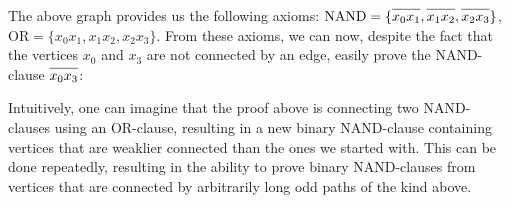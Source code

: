 \FloatBarrier
The above graph provides us the following axioms:
$\text{NAND} = \{\ol{x_0x_1},\ol{x_1x_2},\ol{x_2x_3}\}$, $\text{OR} = \{x_0x_1,x_1x_2,x_2x_3\}$.
From these axioms, we can now, despite the fact that the vertices $x_0$ and $x_3$ are not connected by an edge, easily prove the NAND-clause $\ol{x_0x_3}$:\par
\begin{figure}[!h]
  \centering
  \begin{prooftree*}
  \end{prooftree*}
\caption{}
\label{fig:proof_x0x3}
\end{figure}
Intuitively, one can imagine that the proof above is connecting two NAND-clauses using an OR-clause, resulting in a new binary NAND-clause containing vertices that are weaklier connected than the ones we started with.
This can be done repeatedly, resulting in the ability to prove binary NAND-clauses from vertices that are connected by arbitrarily long odd paths of the kind above.

